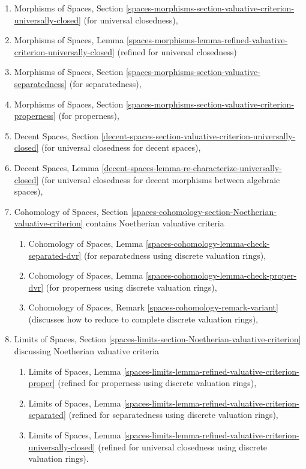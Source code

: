 \begin{enumerate}
\item Morphisms of Spaces, Section
\ref{spaces-morphisms-section-valuative-criterion-universally-closed}
(for universal closedness),
\item Morphisms of Spaces, Lemma
\ref{spaces-morphisms-lemma-refined-valuative-criterion-universally-closed}
(refined for universal closedness)
\item Morphisms of Spaces, Section
\ref{spaces-morphisms-section-valuative-separatedness}
(for separatedness),
\item Morphisms of Spaces, Section
\ref{spaces-morphisms-section-valuative-criterion-properness}
(for properness),
\item Decent Spaces, Section
\ref{decent-spaces-section-valuative-criterion-universally-closed}
(for universal closedness for decent spaces),
\item Decent Spaces, Lemma
\ref{decent-spaces-lemma-re-characterize-universally-closed}
(for universal closedness for decent morphisms between algebraic spaces),
\item Cohomology of Spaces, Section
\ref{spaces-cohomology-section-Noetherian-valuative-criterion}
contains Noetherian valuative criteria
\begin{enumerate}
\item Cohomology of Spaces, Lemma
\ref{spaces-cohomology-lemma-check-separated-dvr}
(for separatedness using discrete valuation rings),
\item Cohomology of Spaces, Lemma
\ref{spaces-cohomology-lemma-check-proper-dvr}
(for properness using discrete valuation rings),
\item Cohomology of Spaces, Remark
\ref{spaces-cohomology-remark-variant}
(discusses how to reduce to complete discrete valuation rings),
\end{enumerate}
\item Limits of Spaces, Section
\ref{spaces-limits-section-Noetherian-valuative-criterion}
discussing Noetherian valuative criteria
\begin{enumerate}
\item Limits of Spaces, Lemma
\ref{spaces-limits-lemma-refined-valuative-criterion-proper}
(refined for properness using discrete valuation rings),
\item Limits of Spaces, Lemma
\ref{spaces-limits-lemma-refined-valuative-criterion-separated}
(refined for separatedness using discrete valuation rings),
\item Limits of Spaces, Lemma
\ref{spaces-limits-lemma-refined-valuative-criterion-universally-closed}
(refined for universal closedness using discrete valuation rings).
\end{enumerate}
\end{enumerate}
